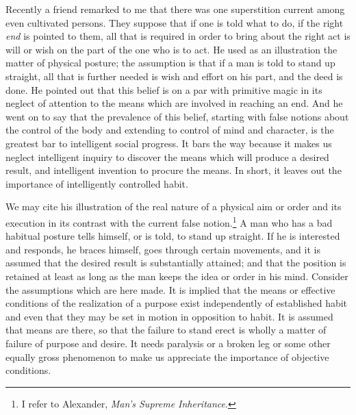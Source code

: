 \documentclass[12pt]{article}
\begin{document}
Recently a friend remarked to me that there was one
superstition current among even cultivated persons.
They suppose that if one is told what to do, if the
right \emph{end} is pointed to them, all that is required in
order to bring about the right act is will or wish on
the part of the one who is to act. He used as an illustration
the matter of physical posture; the assumption
is that if a man is told to stand up straight, all that
is further needed is wish and effort on his part, and
the deed is done. He pointed out that this belief is on
a par with primitive magic in its neglect of attention
to the means which are involved in reaching an end.
And he went on to say that the prevalence of this belief,
starting with false notions about the control of
the body and extending to control of mind and character,
is the greatest bar to intelligent social progress.
It bars the way because it makes us neglect intelligent
inquiry to discover the means which will produce a
desired result, and intelligent invention to procure the
means. In short, it leaves out the importance of intelligently
controlled habit.

We may cite his illustration of the real nature of a
physical aim or order and its execution in its contrast
with the current false notion.\footnote{I refer to Alexander, \emph{Man's Supreme Inheritance}.} A man who has a bad
habitual posture tells himself, or is told, to stand up
straight. If he is interested and responds, he braces
himself, goes through certain movements, and it is assumed
that the desired result is substantially attained;
and that the position is retained at least as long as
the man keeps the idea or order in his mind. Consider
the assumptions which are here made. It is implied
that the means or effective conditions of the realization
of a purpose exist independently of established
habit and even that they may be set in motion in opposition
to habit. It is assumed that means are there,
so that the failure to stand erect is wholly a matter of
failure of purpose and desire. It needs paralysis or
a broken leg or some other equally gross phenomenon
to make us appreciate the importance of objective
conditions.
\end{document}
